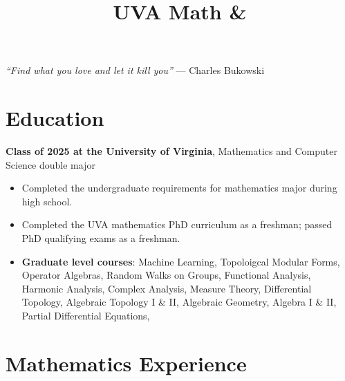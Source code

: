 \documentclass[11pt,letterpaper,sans]{moderncv}
\title{UVA Math \& \CS}
\begin{document}
\makecvtitle %
\vspace*{-3.5em}

\vspace*{-1em}
\begin{center}
\textcolor{color1}{\textit{``Find what you love and let it kill you''} --- Charles Bukowski}
\end{center}

%


\section{Education}
\textbf{Class of 2025 at the University of Virginia}, Mathematics and Computer Science double major
\begin{itemize}
  \item Completed the undergraduate requirements for mathematics major during high school.
  \item Completed the UVA mathematics PhD curriculum as a freshman; passed PhD qualifying exams as a freshman.
  \item \textbf{Graduate level courses}: Machine Learning, Topoloigcal Modular Forms, Operator Algebras, Random Walks on Groups, Functional Analysis, Harmonic Analysis, Complex Analysis, Measure Theory, Differential Topology, Algebraic Topology I \& II, Algebraic Geometry, Algebra I \& II, Partial Differential Equations, 
\end{itemize}



\section{Mathematics Experience}

\end{document}
